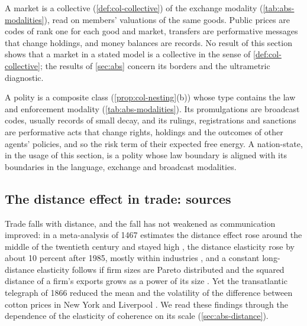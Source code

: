 \begin{definition}[Market]\label{def:abs-market}
A market is a collective (\cref{def:col-collective}) of the exchange modality (\cref{tab:abs-modalities}), read on members' valuations of the same goods. Public prices are codes of rank one for each good and market, transfers are performative messages that change holdings, and money balances are records. No result of this section shows that a market in a stated model is a collective in the sense of \cref{def:col-collective}; the results of \cref{sec:abs} concern its borders and the ultrametric diagnostic.
\end{definition}

\begin{definition}[Polity]\label{def:abs-polity}
A polity is a composite class (\cref{prop:col-nesting}(b)) whose type contains the law and enforcement modality (\cref{tab:abs-modalities}). Its promulgations are broadcast codes, usually records of small decay, and its rulings, registrations and sanctions are performative acts that change rights, holdings and the outcomes of other agents' policies, and so the risk term of their expected free energy. A nation-state, in the usage of this section, is a polity whose law boundary is aligned with its boundaries in the language, exchange and broadcast modalities.
\end{definition}

\subsection{The distance effect in trade: sources}\label{sup:abs-the-distance-effect-in-trade-sources}

Trade falls with distance, and the fall has not weakened as communication improved: in a meta-analysis of 1467 estimates the distance effect rose around the middle of the twentieth century and stayed high \citep{disdier2008puzzling}, the distance elasticity rose by about 10 percent after 1985, mostly within industries \citep{berthelon2008conservation}, and a constant long-distance elasticity follows if firm sizes are Pareto distributed and the squared distance of a firm's exports grows as a power of its size \citep{chaney2018gravity}. Yet the transatlantic telegraph of 1866 reduced the mean and the volatility of the difference between cotton prices in New York and Liverpool \citep{steinwender2018real}. We read these findings through the dependence of the elasticity of coherence on its scale (\cref{sec:abs-distance}).
